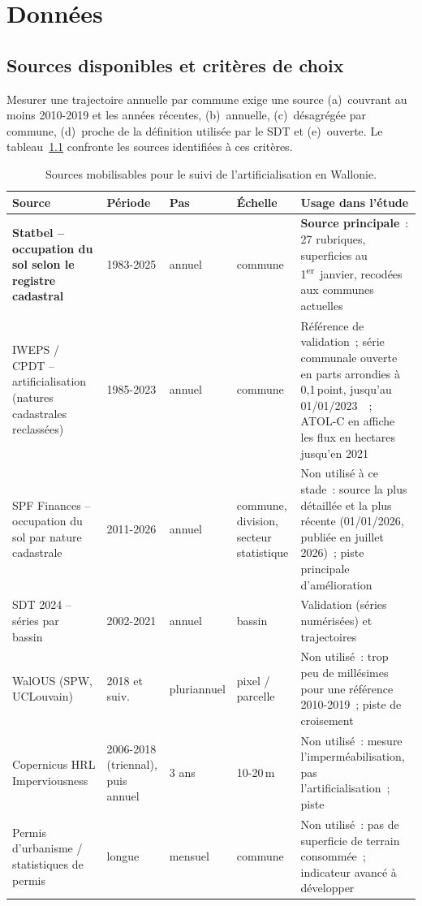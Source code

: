 \documentclass[11pt,a4paper]{report}
\begin{document}
\chapter{Données}
\label{ch:donnees}

\section{Sources disponibles et critères de choix}
Mesurer une trajectoire annuelle par commune exige une source (a)~couvrant au moins 2010-2019 et les années récentes, (b)~annuelle, (c)~désagrégée par commune, (d)~proche de la définition utilisée par le SDT et (e)~ouverte. Le tableau~\ref{tab:sources} confronte les sources identifiées à ces critères.

\begin{table}[ht]
\centering\small
\caption{Sources mobilisables pour le suivi de l'artificialisation en Wallonie.}
\label{tab:sources}
\begin{tabular}{p{3.6cm}p{2.1cm}p{1.6cm}p{2.0cm}p{5.4cm}}
\toprule
Source & Période & Pas & Échelle & Usage dans l'étude \\
\midrule
\textbf{Statbel -- occupation du sol selon le registre cadastral}~\citep{statbel_occ} & 1983-2025 & annuel & commune & \textbf{Source principale}~: 27 rubriques, superficies au 1\textsuperscript{er}~janvier, recodées aux communes actuelles \\
IWEPS / CPDT -- artificialisation (natures cadastrales reclassées)~\citep{iweps_artif} & 1985-2023 & annuel & commune & Référence de validation~; série communale ouverte en parts arrondies à 0,1\,point, jusqu'au 01/01/2023~\citep{iweps_api}~; ATOL-C en affiche les flux en hectares jusqu'en 2021~\citep{atolc2025} \\
SPF Finances -- occupation du sol par nature cadastrale~\citep{spf_occ} & 2011-2026 & annuel & commune, division, secteur statistique & Non utilisé à ce stade~: source la plus détaillée et la plus récente (01/01/2026, publiée en juillet 2026)~; piste principale d'amélioration \\
SDT 2024 -- séries par bassin~\citep{sdt2024} & 2002-2021 & annuel & bassin & Validation (séries numérisées) et trajectoires \\
WalOUS (SPW, UCLouvain)~\citep{walous} & 2018 et suiv. & pluriannuel & pixel / parcelle & Non utilisé~: trop peu de millésimes pour une référence 2010-2019~; piste de croisement \\
Copernicus HRL Imperviousness~\citep{copernicus_hrl} & 2006-2018 (triennal), puis annuel & 3 ans & 10-20\,m & Non utilisé~: mesure l'imperméabilisation, pas l'artificialisation~; piste \\
Permis d'urbanisme / statistiques de permis~\citep{bulletin_permis} & longue & mensuel & commune & Non utilisé~: pas de superficie de terrain consommée~; indicateur avancé à développer \\
\bottomrule
\end{tabular}
\end{table}
\end{document}

